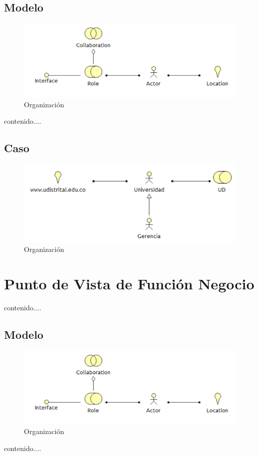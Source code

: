 \subsection{Modelo}
\begin{figure}[th!]
	\centering
	\includegraphics[width=0.8\linewidth]{arquitectura_diseno/imgs/M_Organizacion}
	\caption{Organización}
\end{figure}
\newpage
contenido....
\subsection{Caso}
\begin{figure}[th!]
	\centering
	\includegraphics[width=0.8\linewidth]{arquitectura_diseno/imgs/C_Organizacion}
	\caption{Organización}
\end{figure}
\newpage
\section{Punto de Vista de Función Negocio}
contenido....
\subsection{Modelo}
\begin{figure}[th!]
	\centering
	\includegraphics[width=0.8\linewidth]{arquitectura_diseno/imgs/M_Organizacion}
	\caption{Organización}
\end{figure}
\newpage
contenido....
